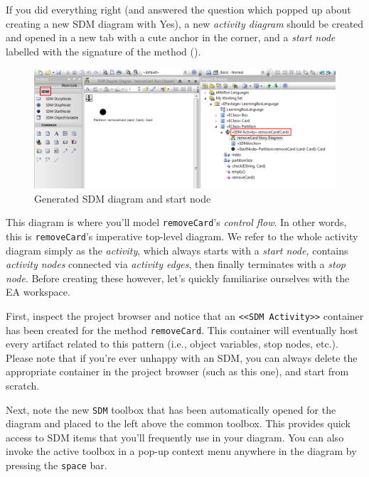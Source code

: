 \begin{stepbystep}
\item If you did everything right (and answered the question which popped up about creating a new SDM diagram with Yes), a new \emph{activity diagram} should be created and opened in a new tab with a cute anchor in
the corner, and a \emph{start node} labelled with the signature of the method ().  

\begin{figure}[htp]
\begin{center}
 \includegraphics[width=1.0\textwidth]{../../org.moflon.doc.handbook.03_storyDiagrams/03_removeCard/visRemImages/ea_generatedSDM}
  \caption{Generated SDM diagram and start node}  
  \label{ea:sdm_skeleton}
\end{center}
\end{figure}

\vspace{0.5cm}

\item This diagram is where you'll model \texttt{removeCard}'s \emph{control flow}. In other words,
this is \texttt{removeCard}'s imperative top-level diagram. We refer to the whole activity diagram simply as the \emph{activity}, which always starts with a
\emph{start node,} contains \emph{activity nodes} connected via \emph{activity edges}, then finally terminates with a \emph{stop node}. Before creating
these however, let's quickly familiarise ourselves with the EA workspace.

\item First, inspect the project browser and notice that an \texttt{<<SDM Activity>>} container has been created for the method
\texttt{removeCard}. This container will eventually host every artifact related to this pattern (i.e., object variables, stop nodes, etc.). Please note
that if you're ever unhappy with an SDM, you can always delete the appropriate container in the project browser (such as this one), and start from scratch.

\item Next, note the new \texttt{SDM} toolbox that has been automatically opened for the diagram and placed to the left above
the common toolbox. This provides quick access to SDM items that you'll frequently use in your diagram. You can also invoke the active toolbox in a pop-up
context menu anywhere in the diagram by pressing the \texttt{space} bar.


\end{stepbystep}
